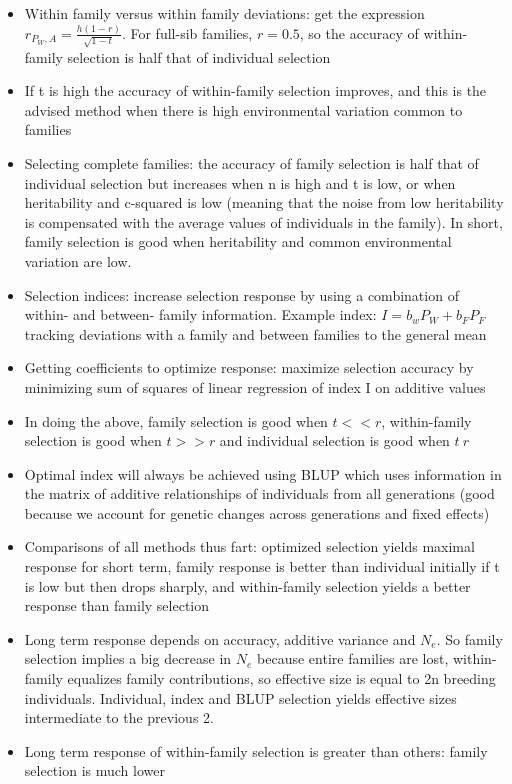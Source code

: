 \documentclass[12pt]{amsart}
\begin{document}
\begin{itemize}
\begin{itemize}
\item Within family versus within family deviations: get the expression $r_{P_W,A} = \frac{h(1-r)}{\sqrt{1-t}}$. For full-sib families, $r = 0.5$, so the accuracy of within-family selection is half that of individual selection 
\item If t is high the accuracy of within-family selection improves, and this is the advised method when there is high environmental variation common to families 
\item Selecting complete families: the accuracy of family selection is half that of individual selection but increases when n is high and t is low, or when heritability and c-squared is low (meaning that the noise from low heritability is compensated with the average values of individuals in the family). In short, family selection is good when heritability and common environmental variation are low.
\item Selection indices: increase selection response by using a combination of within- and between- family information. Example index: $I = b_wP_W + b_FP_F$ tracking deviations with a family and between families to the general mean 
\item Getting coefficients to optimize response: maximize selection accuracy by minimizing sum of squares of linear regression of index I on additive values 
\item In doing the above, family selection is good when $t << r$, within-family selection is good when $t>>r$ and individual selection is good when $t~r$ 
\item Optimal index will always be achieved using BLUP which uses information in the matrix of additive relationships of individuals from all generations (good because we account for genetic changes across generations and fixed effects)
\item Comparisons of all methods thus fart: optimized selection yields maximal response for short term, family response is better than individual initially if t is low but then drops sharply, and within-family selection yields a better response than family selection
\item Long term response depends on accuracy, additive variance and $N_e$. So family selection implies a big decrease in $N_e$ because entire families are lost, within-family equalizes family contributions, so effective size is equal to 2n breeding individuals. Individual, index and BLUP selection yields effective sizes intermediate to the previous 2. 
\item Long term response of within-family selection is greater than others: family selection is much lower

\end{itemize}
\end{itemize}
\end{document}
